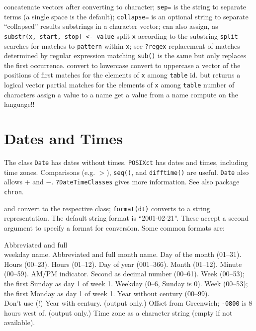 {	{concatenate vectors after converting to character; {\tt sep=} is the string to separate terms (a single space is the default); {\tt collapse=} is an optional string to separate ``collapsed'' results}
	{substrings in a character vector; can also assign, as\\ {\tt substr(x, start, stop) <- value}}
	{split {\tt x} according to the substring {\tt split}}
	{searches for matches to {\tt pattern} within {\tt x}; see {\tt ?regex}}
	{replacement of matches determined by regular expression matching {\tt sub()} is the same but only replaces the first occurrence.}
	{convert to lowercase}
	{convert to uppercase}
	{a vector of the positions of first matches for the elements of {\tt x} among {\tt table}}
	{id. but returns a logical vector}
	{partial matches for the elements of {\tt x} among {\tt table}}
	{number of characters}
	{assign a value to a name}
	{get a value from a name}
	{compute on the language!!}

\section{Dates and Times}{
The class {\tt Date} has dates without times.  {\tt POSIXct} has
dates and times, including time zones. Comparisons (e.g. $>$),
{\tt seq()}, and {\tt difftime()} are useful. {\tt Date} also allows
$+$ and $-$. {\tt ?DateTimeClasses} gives more information. See also package
{\tt chron}.}

	{and}
	{convert to the respective class; {\tt format(dt)} converts to a string representation. The default string format is ``2001-02-21''. These accept a second argument to specify a format for conversion. Some common formats are:}


    	{Abbreviated and full \\weekday name.}
    	{Abbreviated and full month name.}
    	{Day of the month (01--31).}
    	{Hours (00--23).}
    	{Hours (01--12).}
    	{Day of year (001--366).}
    	{Month (01--12).}
    	{Minute (00--59).}
    	{AM/PM indicator. }
    	{Second as decimal number (00--61).}
    	{Week (00--53); the first Sunday as day 1 of week 1.}
    	{Weekday (0--6, Sunday is 0).}
    	{Week (00--53); the first Monday as day 1 of week 1.}
    	{Year without century (00--99).\\Don't use (!)}
    	{Year with century.}
    	{(output only.) Offset from Greenwich; {\tt -0800} is 8 hours west of.}
    	{(output only.) Time zone as a character
      string (empty if not available).}

}
